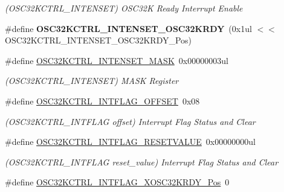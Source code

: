 \begin{DoxyCompactItemize}
\begin{DoxyCompactList}\small\item\em (O\+S\+C32\+K\+C\+T\+R\+L\+\_\+\+I\+N\+T\+E\+N\+S\+E\+T) O\+S\+C32\+K Ready Interrupt Enable \end{DoxyCompactList}\item 
\hypertarget{group___s_a_m_l21___o_s_c32_k_c_t_r_l_ga44763732c40b3088d4d3e8faacf7ae15}{}\#define {\bfseries O\+S\+C32\+K\+C\+T\+R\+L\+\_\+\+I\+N\+T\+E\+N\+S\+E\+T\+\_\+\+O\+S\+C32\+K\+R\+D\+Y}~(0x1ul $<$$<$ O\+S\+C32\+K\+C\+T\+R\+L\+\_\+\+I\+N\+T\+E\+N\+S\+E\+T\+\_\+\+O\+S\+C32\+K\+R\+D\+Y\+\_\+\+Pos)\label{group___s_a_m_l21___o_s_c32_k_c_t_r_l_ga44763732c40b3088d4d3e8faacf7ae15}

\item 
\hypertarget{group___s_a_m_l21___o_s_c32_k_c_t_r_l_gaffc01dd3bc722708c644175127d73070}{}\#define \hyperlink{group___s_a_m_l21___o_s_c32_k_c_t_r_l_gaffc01dd3bc722708c644175127d73070}{O\+S\+C32\+K\+C\+T\+R\+L\+\_\+\+I\+N\+T\+E\+N\+S\+E\+T\+\_\+\+M\+A\+S\+K}~0x00000003ul\label{group___s_a_m_l21___o_s_c32_k_c_t_r_l_gaffc01dd3bc722708c644175127d73070}

\begin{DoxyCompactList}\small\item\em (O\+S\+C32\+K\+C\+T\+R\+L\+\_\+\+I\+N\+T\+E\+N\+S\+E\+T) M\+A\+S\+K Register \end{DoxyCompactList}\item 
\hypertarget{group___s_a_m_l21___o_s_c32_k_c_t_r_l_gaec77fa56678a12082b0db8a754fa1750}{}\#define \hyperlink{group___s_a_m_l21___o_s_c32_k_c_t_r_l_gaec77fa56678a12082b0db8a754fa1750}{O\+S\+C32\+K\+C\+T\+R\+L\+\_\+\+I\+N\+T\+F\+L\+A\+G\+\_\+\+O\+F\+F\+S\+E\+T}~0x08\label{group___s_a_m_l21___o_s_c32_k_c_t_r_l_gaec77fa56678a12082b0db8a754fa1750}

\begin{DoxyCompactList}\small\item\em (O\+S\+C32\+K\+C\+T\+R\+L\+\_\+\+I\+N\+T\+F\+L\+A\+G offset) Interrupt Flag Status and Clear \end{DoxyCompactList}\item 
\hypertarget{group___s_a_m_l21___o_s_c32_k_c_t_r_l_ga29a58edeb42ff385598a3005004dddf0}{}\#define \hyperlink{group___s_a_m_l21___o_s_c32_k_c_t_r_l_ga29a58edeb42ff385598a3005004dddf0}{O\+S\+C32\+K\+C\+T\+R\+L\+\_\+\+I\+N\+T\+F\+L\+A\+G\+\_\+\+R\+E\+S\+E\+T\+V\+A\+L\+U\+E}~0x00000000ul\label{group___s_a_m_l21___o_s_c32_k_c_t_r_l_ga29a58edeb42ff385598a3005004dddf0}

\begin{DoxyCompactList}\small\item\em (O\+S\+C32\+K\+C\+T\+R\+L\+\_\+\+I\+N\+T\+F\+L\+A\+G reset\+\_\+value) Interrupt Flag Status and Clear \end{DoxyCompactList}\item 
\hypertarget{group___s_a_m_l21___o_s_c32_k_c_t_r_l_ga85c2db168fc2fe2f24f7d01f57721a86}{}\#define \hyperlink{group___s_a_m_l21___o_s_c32_k_c_t_r_l_ga85c2db168fc2fe2f24f7d01f57721a86}{O\+S\+C32\+K\+C\+T\+R\+L\+\_\+\+I\+N\+T\+F\+L\+A\+G\+\_\+\+X\+O\+S\+C32\+K\+R\+D\+Y\+\_\+\+Pos}~0\label{group___s_a_m_l21___o_s_c32_k_c_t_r_l_ga85c2db168fc2fe2f24f7d01f57721a86}


\end{DoxyCompactItemize}
